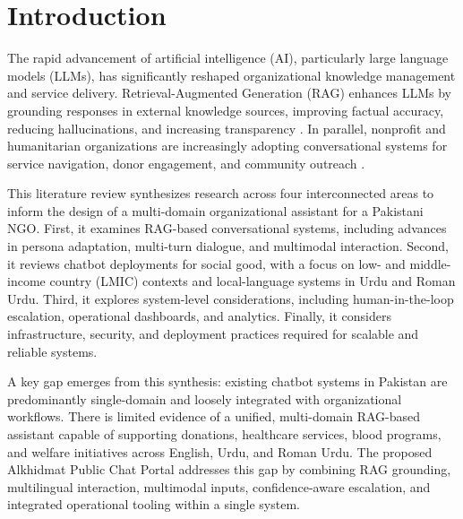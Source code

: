 


\section{Introduction}

The rapid advancement of artificial intelligence (AI), particularly large language models (LLMs), has significantly reshaped organizational knowledge management and service delivery. Retrieval-Augmented Generation (RAG) enhances LLMs by grounding responses in external knowledge sources, improving factual accuracy, reducing hallucinations, and increasing transparency \cite{lewis2020rag,gao2023ragsurvey,fan2024ragllm}. In parallel, nonprofit and humanitarian organizations are increasingly adopting conversational systems for service navigation, donor engagement, and community outreach \cite{folstad2018socialgood,siddiqi2024bablibot,munir2021bablibot}.

This literature review synthesizes research across four interconnected areas to inform the design of a multi-domain organizational assistant for a Pakistani NGO. First, it examines RAG-based conversational systems, including advances in persona adaptation, multi-turn dialogue, and multimodal interaction. Second, it reviews chatbot deployments for social good, with a focus on low- and middle-income country (LMIC) contexts and local-language systems in Urdu and Roman Urdu. Third, it explores system-level considerations, including human-in-the-loop escalation, operational dashboards, and analytics. Finally, it considers infrastructure, security, and deployment practices required for scalable and reliable systems.

A key gap emerges from this synthesis: existing chatbot systems in Pakistan are predominantly single-domain and loosely integrated with organizational workflows. There is limited evidence of a unified, multi-domain RAG-based assistant capable of supporting donations, healthcare services, blood programs, and welfare initiatives across English, Urdu, and Roman Urdu. The proposed Alkhidmat Public Chat Portal addresses this gap by combining RAG grounding, multilingual interaction, multimodal inputs, confidence-aware escalation, and integrated operational tooling within a single system.

